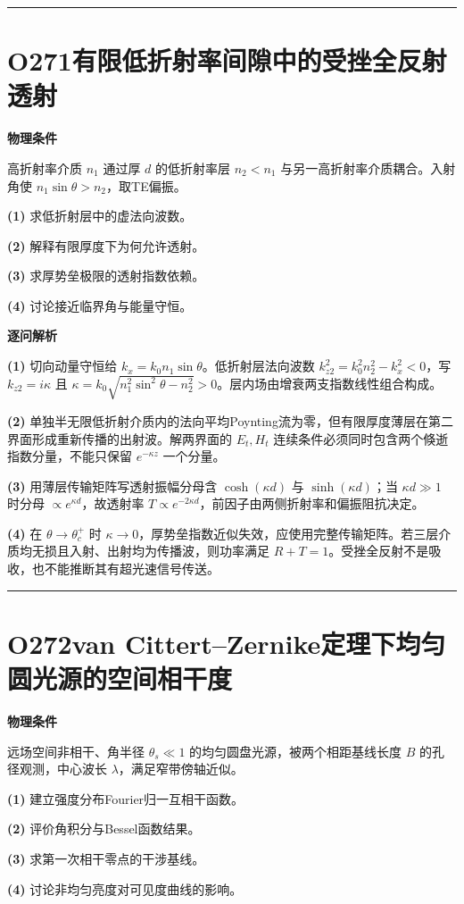 \documentclass[UTF8,a4paper,11pt,oneside,openany]{ctexbook}
\begin{document}
\par\bigskip\hrule\bigskip
\section*{O271\quad 有限低折射率间隙中的受挫全反射透射}
\textbf{物理条件}\par 高折射率介质 \(n_1\) 通过厚 \(d\) 的低折射率层 \(n_2<n_1\) 与另一高折射率介质耦合。入射角使 \(n_1\sin\theta>n_2\)，取TE偏振。
\par\noindent\textbf{(1)} 求低折射层中的虚法向波数。
\par\noindent\textbf{(2)} 解释有限厚度下为何允许透射。
\par\noindent\textbf{(3)} 求厚势垒极限的透射指数依赖。
\par\noindent\textbf{(4)} 讨论接近临界角与能量守恒。

\par\medskip\noindent\textbf{逐问解析}
\par\noindent\textbf{(1)} 切向动量守恒给 \(k_x=k_0n_1\sin\theta\)。低折射层法向波数 \(k_{z2}^2=k_0^2n_2^2-k_x^2<0\)，写 \(k_{z2}=i\kappa\) 且 \(\kappa=k_0\sqrt{n_1^2\sin^2\theta-n_2^2}>0\)。层内场由增衰两支指数线性组合构成。
\par\noindent\textbf{(2)} 单独半无限低折射介质内的法向平均Poynting流为零，但有限厚度薄层在第二界面形成重新传播的出射波。解两界面的 \(E_t,H_t\) 连续条件必须同时包含两个倏逝指数分量，不能只保留 \(e^{-\kappa z}\) 一个分量。
\par\noindent\textbf{(3)} 用薄层传输矩阵写透射振幅分母含 \(\cosh(\kappa d)\) 与 \(\sinh(\kappa d)\)；当 \(\kappa d\gg1\) 时分母 \(\propto e^{\kappa d}\)，故透射率 \(T\propto e^{-2\kappa d}\)，前因子由两侧折射率和偏振阻抗决定。
\par\noindent\textbf{(4)} 在 \(\theta\to\theta_c^+\) 时 \(\kappa\to0\)，厚势垒指数近似失效，应使用完整传输矩阵。若三层介质均无损且入射、出射均为传播波，则功率满足 \(R+T=1\)。受挫全反射不是吸收，也不能推断其有超光速信号传送。

\par\bigskip\hrule\bigskip
\section*{O272\quad van Cittert–Zernike定理下均匀圆光源的空间相干度}
\textbf{物理条件}\par 远场空间非相干、角半径 \(\theta_s\ll1\) 的均匀圆盘光源，被两个相距基线长度 \(B\) 的孔径观测，中心波长 \(\lambda\)，满足窄带傍轴近似。
\par\noindent\textbf{(1)} 建立强度分布Fourier归一互相干函数。
\par\noindent\textbf{(2)} 评价角积分与Bessel函数结果。
\par\noindent\textbf{(3)} 求第一次相干零点的干涉基线。
\par\noindent\textbf{(4)} 讨论非均匀亮度对可见度曲线的影响。
\end{document}

